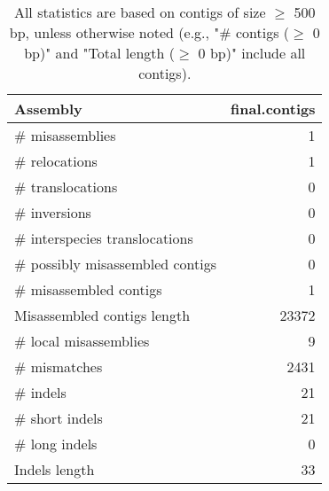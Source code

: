 \documentclass[12pt,a4paper]{article}
\begin{document}
\begin{table}[ht]
\begin{center}
\caption{All statistics are based on contigs of size $\geq$ 500 bp, unless otherwise noted (e.g., "\# contigs ($\geq$ 0 bp)" and "Total length ($\geq$ 0 bp)" include all contigs).}
\begin{tabular}{|l*{1}{|r}|}
\hline
Assembly & final.contigs \\ \hline
\# misassemblies & 1 \\ \hline
\hspace{5mm}\# relocations & 1 \\ \hline
\hspace{5mm}\# translocations & 0 \\ \hline
\hspace{5mm}\# inversions & 0 \\ \hline
\hspace{5mm}\# interspecies translocations & 0 \\ \hline
\# possibly misassembled contigs & 0 \\ \hline
\# misassembled contigs & 1 \\ \hline
Misassembled contigs length & 23372 \\ \hline
\# local misassemblies & 9 \\ \hline
\# mismatches & 2431 \\ \hline
\# indels & 21 \\ \hline
\hspace{5mm}\# short indels & 21 \\ \hline
\hspace{5mm}\# long indels & 0 \\ \hline
Indels length & 33 \\ \hline
\end{tabular}
\end{center}
\end{table}
\end{document}
